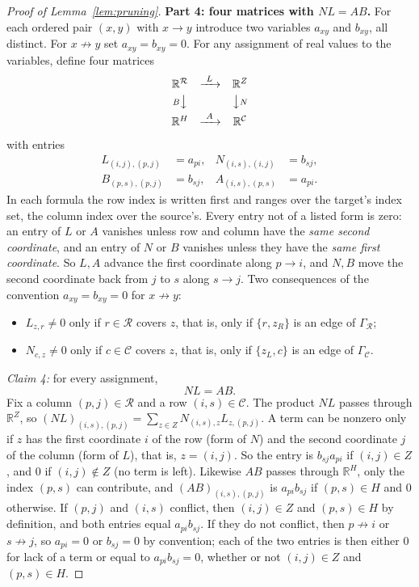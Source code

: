 \documentclass[11pt]{article}
\theoremstyle{remark}
\newcommand{\R}{\mathbb R}
\newcommand{\Step}[1]{\par\medskip\noindent\textbf{#1}\enspace}
\newcommand{\cR}{\mathcal R}
\newcommand{\cC}{\mathcal C}
\begin{document}
\begin{proof}[Proof of Lemma~\ref{lem:pruning}]
\Step{Part 4: four matrices with $NL=AB$.}
For each ordered pair $(x,y)$ with $x\to y$ introduce two variables
$a_{xy}$ and $b_{xy}$, all distinct. For $x\not\to y$ set
$a_{xy}=b_{xy}=0$. For any assignment of real values to the variables,
define four matrices
\[
 \begin{array}{ccc}
 \R^{\mathcal R}&\xrightarrow{\ L\ }&\R^Z\\[3pt]
 {\scriptstyle B}\big\downarrow&&\big\downarrow{\scriptstyle N}\\[3pt]
 \R^H&\xrightarrow{\ A\ }&\R^{\mathcal C}
 \end{array}
\]
with entries
\begin{equation}\label{eq:pruning-maps}
 \begin{aligned}
 L_{(i,j),(p,j)}&=a_{pi},&
 N_{(i,s),(i,j)}&=b_{sj},\\
 B_{(p,s),(p,j)}&=b_{sj},&
 A_{(i,s),(p,s)}&=a_{pi}.
 \end{aligned}
\end{equation}
In each formula the row index is written first and ranges over the target's
index set, the column index over the source's. Every entry not of a listed
form is zero: an entry of $L$ or $A$ vanishes unless row and column have the
\emph{same second coordinate}, and an entry of $N$ or $B$ vanishes unless
they have the \emph{same first coordinate}. So $L,A$ advance the first
coordinate along $p\to i$, and $N,B$ move the second coordinate back from
$j$ to $s$ along $s\to j$. Two consequences of the convention
$a_{xy}=b_{xy}=0$ for $x\not\to y$:
\begin{itemize}[leftmargin=2em]
\item[(O1)] $L_{z,r}\ne0$ only if $r\in\cR$ covers $z$, that is, only if
$\{r,z_R\}$ is an edge of $\Gamma_{\cR}$;
\item[(O2)] $N_{c,z}\ne0$ only if $c\in\cC$ covers $z$, that is, only if
$\{z_L,c\}$ is an edge of $\Gamma_{\cC}$.
\end{itemize}

\emph{Claim 4:} for every assignment,
\begin{equation}\label{eq:pruning-commute}
 NL=AB.
\end{equation}
Fix a column $(p,j)\in\cR$ and a row $(i,s)\in\cC$. The product $NL$ passes
through $\R^Z$, so
$(NL)_{(i,s),(p,j)}=\sum_{z\in Z}N_{(i,s),z}L_{z,(p,j)}$. A term can be
nonzero only if $z$ has the first coordinate $i$ of the row (form of $N$) and
the second coordinate $j$ of the column (form of $L$), that is, $z=(i,j)$.
So the entry is $b_{sj}a_{pi}$ if $(i,j)\in Z$, and $0$ if $(i,j)\notin Z$
(no term is left). Likewise $AB$ passes through $\R^H$, only the index
$(p,s)$ can contribute, and $(AB)_{(i,s),(p,j)}$ is $a_{pi}b_{sj}$ if
$(p,s)\in H$ and $0$ otherwise. If $(p,j)$ and $(i,s)$ conflict, then
$(i,j)\in Z$ and $(p,s)\in H$ by definition, and both entries equal
$a_{pi}b_{sj}$. If they do not conflict, then $p\not\to i$ or $s\not\to j$,
so $a_{pi}=0$ or $b_{sj}=0$ by convention; each of the two entries is then
either $0$ for lack of a term or equal to $a_{pi}b_{sj}=0$, whether or not
$(i,j)\in Z$ and $(p,s)\in H$.


\end{proof}
\end{document}
